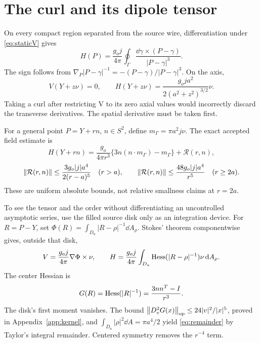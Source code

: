 \section{The curl and its dipole tensor}\label{sec:field}
On every compact region separated from the source wire, differentiation under \eqref{eq:staticV} gives
\begin{equation}\label{eq:curl}
H(P)=\frac{g_oj}{4\pi}\oint_\Gamma
\frac{\dd\gamma\times(P-\gamma)}{|P-\gamma|^3}.
\end{equation}
The sign follows from \(\nabla_P|P-\gamma|^{-1}=-(P-\gamma)/|P-\gamma|^3\). On the axis,
\begin{equation}\label{eq:axis}
V(Y+z\nu)=0,\qquad
H(Y+z\nu)=\frac{g_oj a^2}{2(a^2+z^2)^{3/2}}\nu.
\end{equation}
Taking a curl after restricting V to its zero axial values would incorrectly discard the transverse derivatives. The spatial derivative must be taken first.

For a general point \(P=Y+rn\), \(n\in S^2\), define
\(m_\Gamma=\pi a^2j\nu\). The exact accepted field estimate is~\cite[sections 2--3]{GM04}
\begin{equation}\label{eq:dipole}
H(Y+rn)=\frac{g_o}{4\pi r^3}\{3n(n\cdot m_\Gamma)-m_\Gamma\}
+\mathcal R(r,n),
\end{equation}
\begin{equation}\label{eq:remainder}
\left\lVert\mathcal R(r,n)\right\rVert\le
\frac{3g_o|j|a^4}{2(r-a)^5}\quad(r>a),\qquad
\left\lVert\mathcal R(r,n)\right\rVert\le\frac{48g_o|j|a^4}{r^5}\quad(r\ge2a).
\end{equation}
These are uniform absolute bounds, not relative smallness claims at \(r=2a\).

To see the tensor and the order without differentiating an uncontrolled asymptotic series, use the filled source disk only as an integration device. For \(R=P-Y\), set
\(\Phi(R)=\int_{D_a}|R-\rho|^{-1}\dd A_\rho\). Stokes' theorem componentwise gives, outside that disk,
\begin{equation}\label{eq:diskH}
V=\frac{g_oj}{4\pi}\nabla\Phi\times\nu,\qquad
H=\frac{g_oj}{4\pi}\int_{D_a}\operatorname{Hess}(|R-\rho|^{-1})\nu\,\mathrm d A_\rho.
\end{equation}
The center Hessian is
\begin{equation}\label{eq:kernelG}
G(R)=\operatorname{Hess}(|R|^{-1})=\frac{3nn^T-I}{r^3}.
\end{equation}
The disk's first moment vanishes. The bound
\(\left\lVert D_v^2G(x)\right\rVert_{\rm op}\le24|v|^2/|x|^5\), proved in Appendix~\ref{app:kernel}, and
\(\int_{D_a}|\rho|^2\dd A=\pi a^4/2\) yield \eqref{eq:remainder} by Taylor's integral remainder. Centered symmetry removes the \(r^{-4}\) term.

